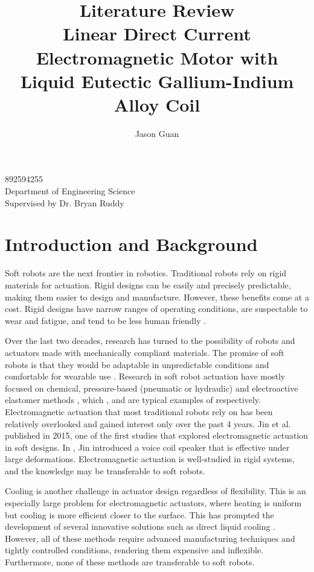 \documentclass[a4paper,12pt]{article}
\title{Literature Review \\
	\large Linear Direct Current Electromagnetic Motor with\\
	Liquid Eutectic Gallium-Indium Alloy Coil}
\author{Jason Guan}
\begin{document}
\maketitle
\begin{center}
    892594255\\
    Department of Engineering Science\\
    Supervised by Dr. Bryan Ruddy
\end{center}

\newpage

\section{Introduction and Background}

Soft robots are the next frontier in robotics. Traditional robots rely on rigid materials for actuation. Rigid designs can be easily and precisely predictable, making them easier to design and manufacture. However, these benefits come at a cost. Rigid designs have narrow ranges of operating conditions, are suspectable to wear and fatigue, and tend to be less human friendly \cite{rusDesignFabricationControl2015}.

Over the last two decades, research has turned to the possibility of robots and actuators made with mechanically compliant materials. The promise of soft robots is that they would be adaptable in unpredictable conditions and comfortable for wearable use \cite{leeSoftRobotReview2017}. Research in soft robot actuation have mostly focused on chemical, pressure-based (pneumatic or hydraulic) and electroactive elastomer methods \cite{rusDesignFabricationControl2015}, which \cite{onalSoftMobileRobots2017}, \cite{suzumoriBendingPneumaticRubber2007} and \cite{andersonMultifunctionalDielectricElastomer2012} are typical examples of respectively. Electromagnetic actuation that most traditional robots rely on has been relatively overlooked and gained interest only over the past 4 years. Jin et al. published \cite{jinStretchableLoudspeakerUsing2015} in 2015, one of the first studies that explored electromagnetic actuation in soft designs. In \cite{jinStretchableLoudspeakerUsing2015}, Jin introduced a voice coil speaker that is effective under large deformations. Electromagnetic actuation is well-studied in rigid systems, and the knowledge may be transferable to soft robots.

Cooling is another challenge in actuator design regardless of flexibility. This is an especially large problem for electromagnetic actuators, where heating is uniform but cooling is more efficient closer to the surface. This has prompted the development of several innovative solutions such as direct liquid cooling \cite{henkeChallengesOpportunitiesVery2018}. However, all of these methods require advanced manufacturing techniques and tightly controlled conditions, rendering them expensive and inflexible. Furthermore, none of these methods are transferable to soft robots.
\end{document}
